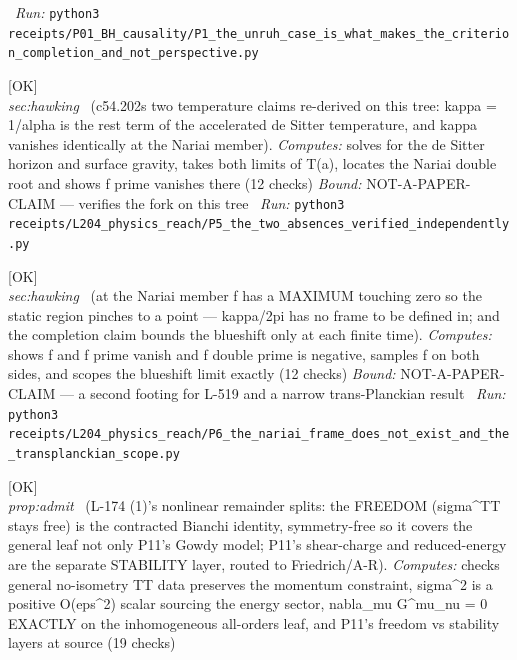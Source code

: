 \begin{description}
\ \emph{Run:} \texttt{python3 receipts/P01\_BH\_causality/P1\_the\_unruh\_case\_is\_what\_makes\_the\_criterion\_completion\_and\_not\_perspective.py}
\item[\label{rcpt:P5_the_two_absences_verified_independently}\texttt{P5\_the\_two\_absences\_verified\_independently}]\hfill\textsf{[OK]}\\
\textit{sec:hawking} \ (c54.202s two temperature claims re-derived on this tree: kappa = 1/alpha is the rest term of the accelerated de Sitter temperature, and kappa vanishes identically at the Nariai member). 
\emph{Computes:} solves for the de Sitter horizon and surface gravity, takes both limits of T(a), locates the Nariai double root and shows f prime vanishes there (12 checks)
 \emph{Bound:} NOT-A-PAPER-CLAIM --- verifies the fork on this tree
\ \emph{Run:} \texttt{python3 receipts/L204\_physics\_reach/P5\_the\_two\_absences\_verified\_independently.py}
\item[\label{rcpt:P6_the_nariai_frame_does_not_exist_and_the_transplanckian_scope}\texttt{P6\_the\_nariai\_frame\_does\_not\_exist\_and\_the\_transplanckian\_scope}]\hfill\textsf{[OK]}\\
\textit{sec:hawking} \ (at the Nariai member f has a MAXIMUM touching zero so the static region pinches to a point --- kappa/2pi has no frame to be defined in; and the completion claim bounds the blueshift only at each finite time). 
\emph{Computes:} shows f and f prime vanish and f double prime is negative, samples f on both sides, and scopes the blueshift limit exactly (12 checks)
 \emph{Bound:} NOT-A-PAPER-CLAIM --- a second footing for L-519 and a narrow trans-Planckian result
\ \emph{Run:} \texttt{python3 receipts/L204\_physics\_reach/P6\_the\_nariai\_frame\_does\_not\_exist\_and\_the\_transplanckian\_scope.py}
\item[\label{rcpt:N1_the_nonlinear_freedom_is_the_general_first_class_structure}\texttt{N1\_the\_nonlinear\_freedom\_is\_the\_general\_first\_class\_structure}]\hfill\textsf{[OK]}\\
\textit{prop:admit} \ (L-174 (1)'s nonlinear remainder splits: the FREEDOM (sigma\textasciicircum{}TT stays free) is the contracted Bianchi identity, symmetry-free so it covers the general leaf not only P11's Gowdy model; P11's shear-charge and reduced-energy are the separate STABILITY layer, routed to Friedrich/A-R). 
\emph{Computes:} checks general no-isometry TT data preserves the momentum constraint, sigma\textasciicircum{}2 is a positive O(eps\textasciicircum{}2) scalar sourcing the energy sector, nabla\_mu G\textasciicircum{}mu\_nu = 0 EXACTLY on the inhomogeneous all-orders leaf, and P11's freedom vs stability layers at source (19 checks)

\end{description}
